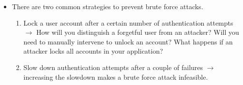 \documentclass[../main.tex]{subfiles}
\begin{document}
\begin{itemize}
\begin{enumerate}
\end{enumerate}
\item There are two common strategies to prevent brute force attacks.
\begin{enumerate}
\item Lock a user account after a certain number of authentication attempts $\rightarrow$ How will you distinguish a forgetful user from an attacker? Will you need to manually intervene to unlock an account? What happens if an attacker locks all accounts in your application?
\item Slow down authentication attempts after a couple of failures $\rightarrow$ increasing the slowdown makes a brute force attack infeasible.
\end{enumerate}
\end{itemize}
\end{document}
